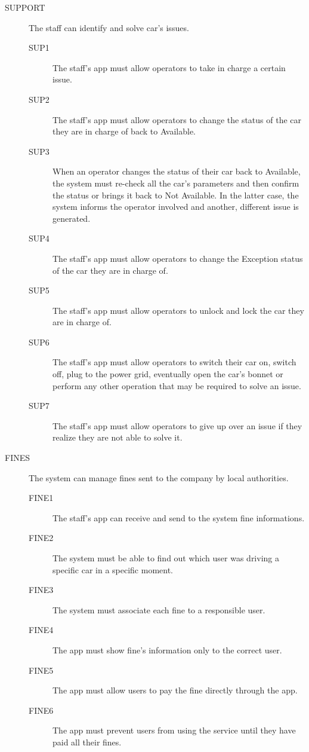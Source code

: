 \documentclass[11pt]{article} %
\begin{document}
\begin{description}
	\item[SUPPORT] The staff can identify and solve car's issues.
	\begin{description}
	\item[SUP1] The staff's app must allow operators to take in charge a certain issue.
	\item[SUP2] The staff's app must allow operators to change the status of the car they are in charge of back to Available.
	\item[SUP3] When an operator changes the status of their car back to Available, the system must re-check all the car's parameters and then confirm the status or brings it back to Not Available. In the latter case, the system informs the operator involved and another, different issue is generated.
	\item[SUP4] The staff's app must allow operators to change the Exception status of the car they are in charge of.	
	\item[SUP5] The staff's app must allow operators to unlock and lock the car they are in charge of.
	\item[SUP6] The staff's app must allow operators to switch their car on, switch off, plug to the power grid, eventually open the car's bonnet or perform any other operation that may be required to solve an issue.
	\item[SUP7] The staff's app must allow operators to give up over an issue if they realize they are not able to solve it.
	\end{description}

	\item[FINES]  The system can manage fines sent to the company by local authorities.
	\begin{description}
	\item[FINE1] The staff's app can receive and send to the system fine informations.
	\item[FINE2] The system must be able to find out which user was driving a specific car in a specific moment.
	\item[FINE3] The system must associate each fine to a responsible user.
	\item[FINE4] The app must show fine's information only to the correct user.
	\item[FINE5] The app must allow users to pay the fine directly through the app.
	\item[FINE6] The app must prevent users from using the service until they have paid all their fines.
	\end{description} 
\end{description}
\end{document}
